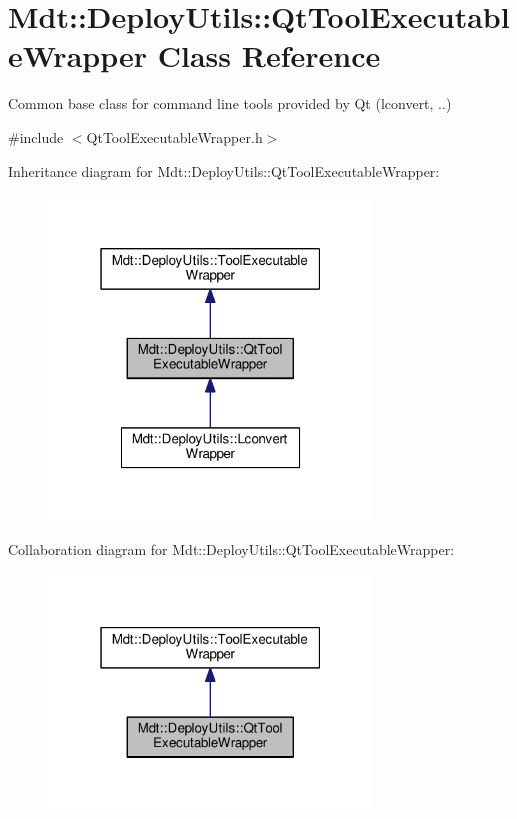 \hypertarget{class_mdt_1_1_deploy_utils_1_1_qt_tool_executable_wrapper}{}\section{Mdt\+:\+:Deploy\+Utils\+:\+:Qt\+Tool\+Executable\+Wrapper Class Reference}
\label{class_mdt_1_1_deploy_utils_1_1_qt_tool_executable_wrapper}


Common base class for command line tools provided by Qt (lconvert, ..)  




{\ttfamily \#include $<$Qt\+Tool\+Executable\+Wrapper.\+h$>$}



Inheritance diagram for Mdt\+:\+:Deploy\+Utils\+:\+:Qt\+Tool\+Executable\+Wrapper\+:\nopagebreak
\begin{figure}[H]
\begin{center}
\leavevmode
\includegraphics[width=244pt]{class_mdt_1_1_deploy_utils_1_1_qt_tool_executable_wrapper__inherit__graph}
\end{center}
\end{figure}


Collaboration diagram for Mdt\+:\+:Deploy\+Utils\+:\+:Qt\+Tool\+Executable\+Wrapper\+:\nopagebreak
\begin{figure}[H]
\begin{center}
\leavevmode
\includegraphics[width=244pt]{class_mdt_1_1_deploy_utils_1_1_qt_tool_executable_wrapper__coll__graph}
\end{center}
\end{figure}
